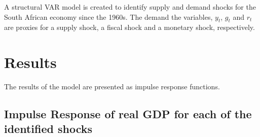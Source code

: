 \documentclass[11pt,preprint, authoryear]{elsarticle}
\numberwithin{equation}{section}
\numberwithin{figure}{section}
\numberwithin{table}{section}
\begin{document}
A structural VAR model is created to identify supply and demand shocks
for the South African economy since the 1960s. The demand the variables,
\(y_t\), \(g_t\) and \(r_t\) are proxies for a supply shock, a fiscal
shock and a monetary shock, respectively.

\hypertarget{results}{%
\section{Results}\label{results}}

The results of the model are presented as impulse response functions.

\hypertarget{impulse-response-of-real-gdp-for-each-of-the-identified-shocks}{%
\subsection{Impulse Response of real GDP for each of the identified
shocks}\label{impulse-response-of-real-gdp-for-each-of-the-identified-shocks}}
\end{document}
